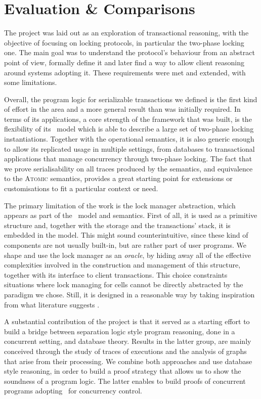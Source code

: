 \chapter{Evaluation \& Comparisons}

\label{sec:eval}

The project was laid out as an exploration of transactional reasoning, with the objective of focusing on locking protocols, in particular the two-phase locking one. The main goal was to understand the protocol's behaviour from an abstract point of view, formally define it and later find a way to allow client reasoning around systems adopting it. These requirements were met and extended, with some limitations.

Overall, the program logic for serializable transactions we defined is the first kind of effort in the area and a more general result than was initially required. In terms of its applications, a core strength of the framework that was built, is the flexibility of its \tpl\ model which is able to describe a large set of two-phase locking instantiations. Together with the operational semantics, it is also generic enough to allow its replicated usage in multiple settings, from databases to transactional applications that manage concurrency through two-phase locking. The fact that we prove serialisability on all traces produced by the semantics, and equivalence to the \textsc{Atomic} semantics, provides a great starting point for extensions or customisations to fit a particular context or need.

The primary limitation of the work is the lock manager abstraction, which appears as part of the \tpl\ model and semantics. First of all, it is used as a primitive structure and, together with the storage and the transactions' stack, it is embedded in the model. This might sound counterintuitive, since these kind of components are not usually built-in, but are rather part of user programs. We shape and use the lock manager as an \textit{oracle}, by hiding away all of the effective complexities involved in the construction and management of this structure, together with its interface to client transactions. This choice constraints situations where lock managing for cells cannot be directly abstracted by the paradigm we chose. Still, it is designed in a reasonable way by taking inspiration from what literature suggests \cite{ccontrol}.

A substantial contribution of the project is that it served as a starting effort to build a bridge between separation logic style program reasoning, done in a concurrent setting, and database theory. Results in the latter group, are mainly conceived through the study of traces of executions and the analysis of graphs that arise from their processing. We combine both approaches and use database style reasoning, in order to build a proof strategy that allows us to show the soundness of a program logic. The latter enables to build proofs of concurrent programs adopting \tpl\ for concurrency control.

